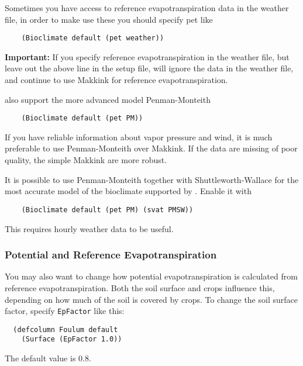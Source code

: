 \documentclass[a4paper,11pt]{article}
\begin{document}
Sometimes you have access to reference evapotranspiration data in the
weather file, in order to make \daisy{} use these you should specify
pet like
\begin{verbatim}
    (Bioclimate default (pet weather))
\end{verbatim}
\textbf{Important:}  If you specify reference evapotranspiration in
the weather file, but leave out the above line in the \daisy{} setup
file, \daisy{} will ignore the data in the weather file, and continue
to use Makkink for reference evapotranspiration.

\Daisy{} also support the more advanced model Penman-Monteith
\begin{verbatim}
    (Bioclimate default (pet PM))
\end{verbatim}
If you have reliable information about vapor pressure and wind, it is
much preferable to use Penman-Monteith over Makkink.  If the data are
missing of poor quality, the simple Makkink are more robust.

It is possible to use Penman-Monteith together with
Shuttleworth-Wallace for the most accurate model of the bioclimate
supported by \daisy{}.  Enable it with
\begin{verbatim}
    (Bioclimate default (pet PM) (svat PMSW))
\end{verbatim}
This requires hourly weather data to be useful.  

\subsubsection{Potential and Reference Evapotranspiration}

You may also want to change how potential evapotranspiration is
calculated from reference evapotranspiration.  Both the soil surface
and crops influence this, depending on how much of the soil is covered
by crops.  To change the soil surface factor, specify
\texttt{EpFactor} like this:
\begin{verbatim}
  (defcolumn Foulum default
    (Surface (EpFactor 1.0))
\end{verbatim}
The default value is 0.8.
\end{document}
